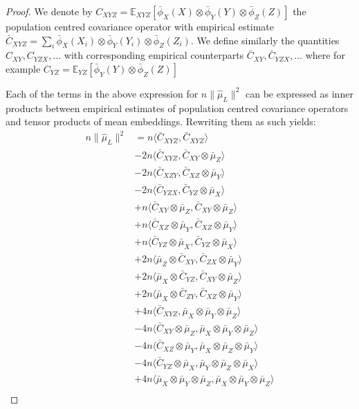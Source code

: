\documentclass[]{article}
\begin{document}
\begin{proof}
We denote by $C_{XYZ} = \mathbb{E}_{XYZ}[\bar\phi_X(X)\otimes\bar\phi_Y(Y)\otimes\bar\phi_Z(Z)]$ the population centred covariance operator with empirical estimate $\bar{C}_{XYZ} = \sum_i\bar\phi_X(X_i)\otimes\bar\phi_Y(Y_i)\otimes\bar\phi_Z(Z_i)$. We define similarly the quantities $C_{XY}, C_{YZX}, \ldots$ with corresponding empirical counterparts $\bar{C}_{XY}, \bar{C}_{YZX}, \ldots$ where for example $C_{YZ} = \mathbb{E}_{YZ}[\bar\phi_Y(Y)\otimes\bar\phi_Z(Z)]$

Each of the terms in the above expression for $n\|\hat \mu_L\|^2$ can be expressed as inner products between empirical estimates of population centred covariance operators and tensor products of mean embeddings. Rewriting them as such yields:
\begin{align*}
n\|\hat \mu_L\|^2 &= n\langle \bar{C}_{XYZ},\bar{C}_{XYZ} \rangle \\& -
2n\langle \bar{C}_{XYZ},\bar{C}_{XY}\otimes\bar{\mu}_Z \rangle \\& -
2n\langle \bar{C}_{XZY},\bar{C}_{XZ}\otimes\bar{\mu}_Y \rangle \\& -
2n\langle \bar{C}_{YZX},\bar{C}_{YZ}\otimes\bar{\mu}_X \rangle \\& +
n\langle \bar{C}_{XY}\otimes\bar{\mu}_Z,\bar{C}_{XY}\otimes\bar{\mu}_Z \rangle \\& +
n\langle \bar{C}_{XZ}\otimes\bar{\mu}_Y,\bar{C}_{XZ}\otimes\bar{\mu}_Y \rangle \\& +
n\langle \bar{C}_{YZ}\otimes\bar{\mu}_X,\bar{C}_{YZ}\otimes\bar{\mu}_X \rangle \\& +
2n\langle \bar{\mu}_Z\otimes\bar{C}_{XY},\bar{C}_{ZX}\otimes\bar{\mu}_Y \rangle \\& +
2n\langle \bar{\mu}_X\otimes\bar{C}_{YZ},\bar{C}_{XY}\otimes\bar{\mu}_Z \rangle \\& +
2n\langle \bar{\mu}_X\otimes\bar{C}_{ZY},\bar{C}_{XZ}\otimes\bar{\mu}_Y \rangle \\& +
4n\langle \bar{C}_{XYZ},\bar{\mu}_X \otimes\bar{\mu}_Y \otimes \bar{\mu}_Z \rangle \\& -
4n\langle \bar{C}_{XY}\otimes \bar{\mu}_Z,\bar{\mu}_X \otimes\bar{\mu}_Y \otimes \bar{\mu}_Z \rangle \\& -
4n\langle \bar{C}_{XZ}\otimes \bar{\mu}_Y,\bar{\mu}_X \otimes\bar{\mu}_Z \otimes \bar{\mu}_Y \rangle \\& -
4n\langle \bar{C}_{YZ}\otimes \bar{\mu}_X,\bar{\mu}_Y \otimes\bar{\mu}_Z \otimes \bar{\mu}_X \rangle \\& +
4n\langle \bar{\mu}_X \otimes\bar{\mu}_Y \otimes \bar{\mu}_Z,\bar{\mu}_X \otimes\bar{\mu}_Y \otimes \bar{\mu}_Z \rangle \\

\end{align*}
\end{proof}
\end{document}
